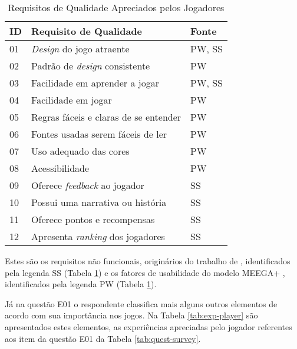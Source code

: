 \begin{apendicesenv}
\begin{table}[htbp]
\centering
\caption{Requisitos de Qualidade Apreciados pelos Jogadores}
\label{tab:req-qualit}
\begin{tabular}{|p{1cm}|p{7cm}|p{1.5cm}|}
\hline
\textbf{ID}& \textbf{Requisito de Qualidade} & Fonte \\ \hline
01             & \textit{Design} do jogo atraente & PW, SS\\ \hline
02             & Padrão de \textit{design} consistente & PW\\ \hline
03             & Facilidade em aprender a jogar & PW, SS  \\ \hline
04             & Facilidade em jogar & PW  \\ \hline
05             & Regras fáceis e claras de se entender & PW \\ \hline
06             & Fontes usadas serem fáceis de ler & PW \\ \hline
07             & Uso adequado das cores & PW \\ \hline
08             & Acessibilidade & PW \\ \hline
09             & Oferece \textit{feedback} ao jogador  & SS \\ \hline
10             & Possui uma narrativa ou história  &  SS \\ \hline
11             & Oferece pontos e recompensas  & SS \\ \hline
12             & Apresenta \textit{ranking} dos jogadores & SS \\ \hline
\end{tabular}

\end{table}


Estes são os requisitos não funcionais, originários do trabalho de , identificados pela legenda SS (Tabela \ref{tab:req-qualit}) e os fatores de usabilidade do modelo MEEGA+ \cite{Petri_Wangenheim_2019}, identificados pela legenda PW (Tabela \ref{tab:req-qualit}).

\newpage

Já na questão E01 o respondente classifica mais alguns outros elementos de acordo com sua importância nos jogos. Na Tabela \ref{tab:exp-player} são apresentados estes elementos, as experiências apreciadas pelo jogador referentes aos item da questão E01 da Tabela \ref{tab:quest-survey}.


\end{apendicesenv}
